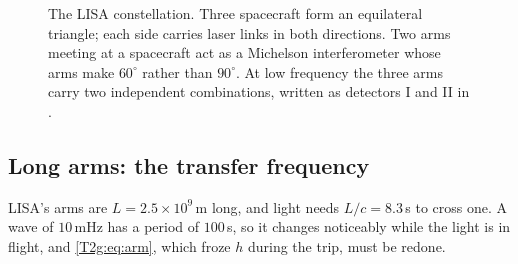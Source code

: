 \begin{figure}[htbp]
\centering
{}
\caption{The LISA constellation. Three spacecraft form an equilateral triangle; each side carries laser links in both directions. Two arms meeting at a spacecraft act as a Michelson interferometer whose arms make $60^\circ$ rather than $90^\circ$. At low frequency the three arms carry two independent combinations, written as detectors I and II in \cite[eqs.~(11)--(12)]{BarackCutler2004}.}
\label{T2a:fig:lisa-triangle}
\end{figure}

\subsection{Long arms: the transfer frequency}

LISA's arms are $L=2.5\times10^9$\,m long, and light needs $L/c=8.3$\,s to cross one. A wave of $10$\,mHz has a period of $100$\,s, so it changes noticeably while the light is in flight, and \eqref{T2g:eq:arm}, which froze $h$ during the trip, must be redone.

